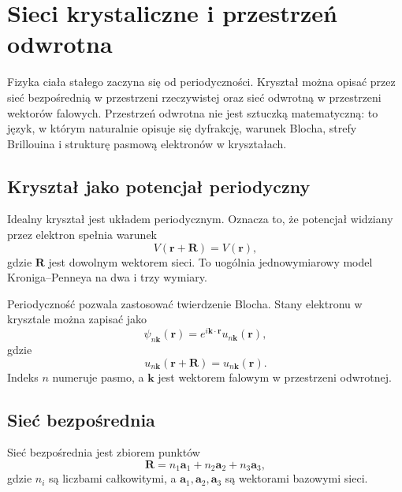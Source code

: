 \chapter{Sieci krystaliczne i przestrzeń odwrotna}

\begin{summarybox}
Fizyka ciała stałego zaczyna się od periodyczności. Kryształ można opisać przez
sieć bezpośrednią w przestrzeni rzeczywistej oraz sieć odwrotną w przestrzeni
wektorów falowych. Przestrzeń odwrotna nie jest sztuczką matematyczną: to język,
w którym naturalnie opisuje się dyfrakcję, warunek Blocha, strefy Brillouina i
strukturę pasmową elektronów w kryształach.
\end{summarybox}

\section{Kryształ jako potencjał periodyczny}

Idealny kryształ jest układem periodycznym. Oznacza to, że potencjał widziany przez elektron spełnia warunek
\begin{equation}
    V(\mathbf{r}+\mathbf{R})=V(\mathbf{r}),
\end{equation}
gdzie \(\mathbf{R}\) jest dowolnym wektorem sieci. To uogólnia jednowymiarowy model Kroniga--Penneya na dwa i trzy wymiary.

Periodyczność pozwala zastosować twierdzenie Blocha. Stany elektronu w krysztale można zapisać jako
\begin{equation}
    \psi_{n\mathbf{k}}(\mathbf{r})=e^{i\mathbf{k}\cdot\mathbf{r}}u_{n\mathbf{k}}(\mathbf{r}),
\end{equation}
gdzie
\begin{equation}
    u_{n\mathbf{k}}(\mathbf{r}+\mathbf{R})=u_{n\mathbf{k}}(\mathbf{r}).
\end{equation}
Indeks \(n\) numeruje pasmo, a \(\mathbf{k}\) jest wektorem falowym w przestrzeni odwrotnej.

\section{Sieć bezpośrednia}

Sieć bezpośrednia jest zbiorem punktów
\begin{equation}
    \mathbf{R}=n_1\mathbf{a}_1+n_2\mathbf{a}_2+n_3\mathbf{a}_3,
\end{equation}
gdzie \(n_i\) są liczbami całkowitymi, a \(\mathbf{a}_1,\mathbf{a}_2,\mathbf{a}_3\) są wektorami bazowymi sieci.


